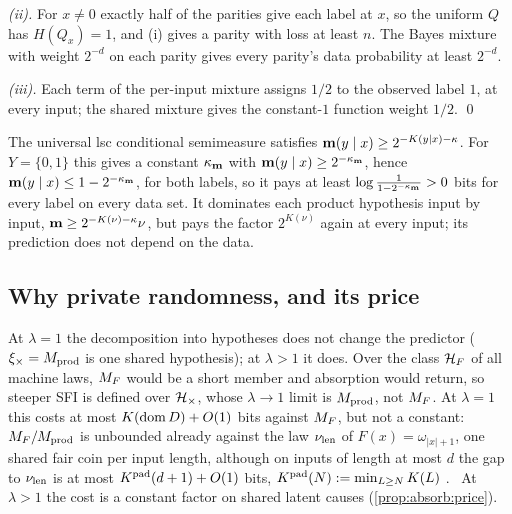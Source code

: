 \emph{(ii).} For $x\ne0$ exactly half of the parities give each label at $x$, so the uniform $Q$ has $H(Q_x)=1$, and (i) gives a parity with loss at least $n$. The Bayes mixture with weight $2^{-d}$ on each parity gives every parity's data probability at least $2^{-d}$.

\emph{(iii).} Each term of the per-input mixture assigns $1/2$ to the observed label $1$, at every input; the shared mixture gives the constant-$1$ function weight $1/2$. \qed

\begin{remark}\label{rem:absorb:condsemi}
The universal lsc conditional semimeasure satisfies $\mathbf{m}(y\mid x)\ge2^{-K(y\mid x)-\kappa}$. For $Y=\{0,1\}$ this gives a constant $\kappa_{\mathbf{m}}$ with $\mathbf{m}(y\mid x)\ge2^{-\kappa_{\mathbf{m}}}$, hence $\mathbf{m}(y\mid x)\le1-2^{-\kappa_{\mathbf{m}}}$, for both labels, so it pays at least $\log\frac1{1-2^{-\kappa_{\mathbf{m}}}}>0$ bits for every label on every data set. It dominates each product hypothesis input by input, $\mathbf{m}\ge2^{-K(\nu)-\kappa}\nu$, but pays the factor $2^{K(\nu)}$ again at every input; its prediction does not depend on the data.
\end{remark}

\subsection{Why private randomness, and its price}\label{app:absorb:price}

\begin{remark}\label{rem:absorb:why}
At $\lambda=1$ the decomposition into hypotheses does not change the predictor ($\xi_\times=M_{\mathrm{prod}}$ is one shared hypothesis); at $\lambda>1$ it does. Over the class $\mathcal{H}_{F}$ of all machine laws, $M_{F}$ would be a short member and absorption would return, so steeper SFI is defined over $\mathcal{H}_{\times}$, whose $\lambda\to1$ limit is $M_{\mathrm{prod}}$, not $M_{F}$. At $\lambda=1$ this costs at most $K(\operatorname{dom} D)+O(1)$ bits against $M_{F}$, but not a constant: $M_{F}/M_{\mathrm{prod}}$ is unbounded already against the law $\nu_{\mathrm{len}}$ of $F(x)=\omega_{|x|+1}$, one shared fair coin per input length, although on inputs of length at most $d$ the gap to $\nu_{\mathrm{len}}$ is at most $K^{\mathrm{pad}}(d+1)+O(1)$ bits, $K^{\mathrm{pad}}(N):=\min_{L\ge N}K(L)$ \citep[Theorem~4.4, Proposition~4.7 and Remark~4.8]{claudeSFI2026fundamentals}.%
\ At $\lambda>1$ the cost is a constant factor on shared latent causes (\cref{prop:absorb:price}).
\end{remark}


